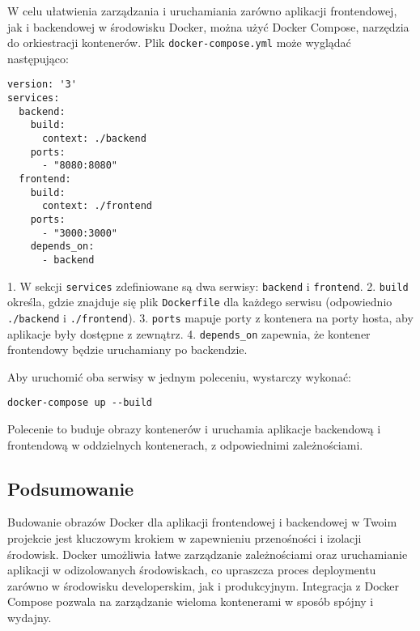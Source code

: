 W celu ułatwienia zarządzania i uruchamiania zarówno aplikacji frontendowej, jak i backendowej w środowisku Docker, można użyć Docker Compose, narzędzia do orkiestracji kontenerów. Plik \texttt{docker-compose.yml} może wyglądać następująco:

\begin{verbatim}
version: '3'
services:
  backend:
    build:
      context: ./backend
    ports:
      - "8080:8080"
  frontend:
    build:
      context: ./frontend
    ports:
      - "3000:3000"
    depends_on:
      - backend
\end{verbatim}

1. W sekcji \texttt{services} zdefiniowane są dwa serwisy: \texttt{backend} i \texttt{frontend}.
2. \texttt{build} określa, gdzie znajduje się plik \texttt{Dockerfile} dla każdego serwisu (odpowiednio \texttt{./backend} i \texttt{./frontend}).
3. \texttt{ports} mapuje porty z kontenera na porty hosta, aby aplikacje były dostępne z zewnątrz.
4. \texttt{depends\_on} zapewnia, że kontener frontendowy będzie uruchamiany po backendzie.

Aby uruchomić oba serwisy w jednym poleceniu, wystarczy wykonać:

\begin{verbatim}
docker-compose up --build
\end{verbatim}

Polecenie to buduje obrazy kontenerów i uruchamia aplikacje backendową i frontendową w oddzielnych kontenerach, z odpowiednimi zależnościami.

\subsection{Podsumowanie}

Budowanie obrazów Docker dla aplikacji frontendowej i backendowej w Twoim projekcie jest kluczowym krokiem w zapewnieniu przenośności i izolacji środowisk. Docker umożliwia łatwe zarządzanie zależnościami oraz uruchamianie aplikacji w odizolowanych środowiskach, co upraszcza proces deploymentu zarówno w środowisku developerskim, jak i produkcyjnym. Integracja z Docker Compose pozwala na zarządzanie wieloma kontenerami w sposób spójny i wydajny.